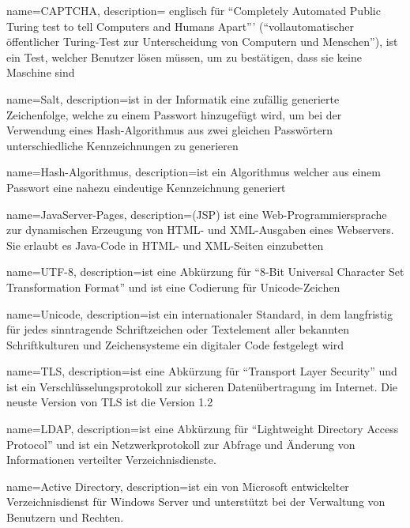 {
	name=CAPTCHA,
	description={
		englisch für "`Completely Automated Public Turing test to tell Computers and Humans Apart"'' ("`vollautomatischer öffentlicher Turing-Test zur Unterscheidung von Computern und Menschen"'), ist ein Test, welcher Benutzer lösen müssen, um zu bestätigen, dass sie keine Maschine sind
	}
}



{
	name=Salt,
	description={ist in der Informatik eine zufällig generierte Zeichenfolge, welche zu einem Passwort  hinzugefügt wird, um bei der Verwendung eines Hash-Algorithmus aus zwei gleichen Passwörtern unterschiedliche Kennzeichnungen zu generieren}
}

{
	name={Hash-Algorithmus},
	description={ist ein Algorithmus welcher aus einem Passwort eine nahezu eindeutige Kennzeichnung generiert}
}

{
	name={JavaServer-Pages},
	description={(JSP) ist eine Web-Programmiersprache zur dynamischen Erzeugung von HTML- und XML-Ausgaben eines Webservers. Sie erlaubt es Java-Code in HTML- und XML-Seiten einzubetten}
}

{
	name={UTF-8},
	description={ist eine Abkürzung für "`8-Bit Universal Character Set Transformation Format"' und ist eine Codierung für \gls{Unicode}-Zeichen}
}

{
	name={Unicode},
	description={ist ein internationaler Standard, in dem langfristig für jedes sinntragende Schriftzeichen oder Textelement aller bekannten Schriftkulturen und Zeichensysteme ein digitaler Code festgelegt wird}
}

{
	name={TLS},
	description={ist eine Abkürzung für "`Transport Layer Security"' und ist ein Verschlüsselungsprotokoll zur sicheren Datenübertragung im Internet. Die neuste Version von \gls{TLS} ist die Version 1.2}
}
{
	name={LDAP},
	description={ist eine Abkürzung für "`Lightweight Directory Access Protocol"' und  ist ein Netzwerkprotokoll zur Abfrage und Änderung von Informationen verteilter Verzeichnisdienste.}

}
{
	name={Active Directory},
	description={ist ein von Microsoft entwickelter Verzeichnisdienst für Windows Server und unterstützt bei der Verwaltung von Benutzern und Rechten.}

}